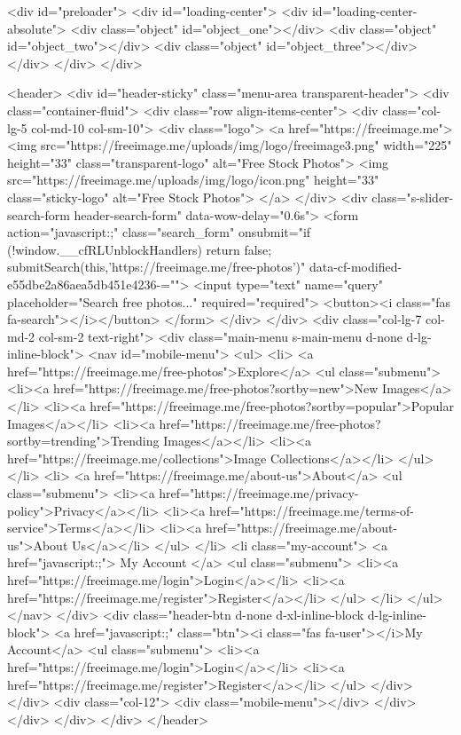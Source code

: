 <div id="preloader">
<div id="loading-center">
<div id="loading-center-absolute">
<div class="object" id="object_one"></div>
<div class="object" id="object_two"></div>
<div class="object" id="object_three"></div>
</div>
</div>
</div>


<header>
<div id="header-sticky" class="menu-area transparent-header">
<div class="container-fluid">
<div class="row align-items-center">
<div class="col-lg-5 col-md-10 col-sm-10">
<div class="logo">
<a href="https://freeimage.me">
<img src="https://freeimage.me/uploads/img/logo/freeimage3.png" width="225" height="33" class="transparent-logo" alt="Free Stock Photos">
<img src="https://freeimage.me/uploads/img/logo/icon.png" height="33" class="sticky-logo" alt="Free Stock Photos">
</a>
</div>
<div class="s-slider-search-form header-search-form" data-wow-delay="0.6s">
<form action="javascript:;" class="search_form" onsubmit="if (!window.__cfRLUnblockHandlers) return false; submitSearch(this,'https://freeimage.me/free-photos')" data-cf-modified-e55dbe2a86aea5db451e4236-="">
<input type="text" name="query" placeholder="Search free photos..." required="required">
<button><i class="fas fa-search"></i></button>
</form>
</div>
</div>
<div class="col-lg-7 col-md-2 col-sm-2 text-right">
<div class="main-menu s-main-menu d-none d-lg-inline-block">
<nav id="mobile-menu">
<ul>
<li>
<a href="https://freeimage.me/free-photos">Explore</a>
<ul class="submenu">
<li><a href="https://freeimage.me/free-photos?sortby=new">New Images</a></li>
<li><a href="https://freeimage.me/free-photos?sortby=popular">Popular Images</a></li>
<li><a href="https://freeimage.me/free-photos?sortby=trending">Trending Images</a></li>
<li><a href="https://freeimage.me/collections">Image Collections</a></li>
</ul>
</li>
<li>
<a href="https://freeimage.me/about-us">About</a>
<ul class="submenu">
<li><a href="https://freeimage.me/privacy-policy">Privacy</a></li>
<li><a href="https://freeimage.me/terms-of-service">Terms</a></li>
<li><a href="https://freeimage.me/about-us">About Us</a></li>
</ul>
</li>
<li class="my-account">
<a href="javascript:;">
My Account
</a>
<ul class="submenu">
<li><a href="https://freeimage.me/login">Login</a></li>
<li><a href="https://freeimage.me/register">Register</a></li>
</ul>
</li>
</ul>
</nav>
</div>
<div class="header-btn d-none d-xl-inline-block d-lg-inline-block">
<a href="javascript:;" class="btn"><i class="fas fa-user"></i>My Account</a>
<ul class="submenu">
<li><a href="https://freeimage.me/login">Login</a></li>
<li><a href="https://freeimage.me/register">Register</a></li>
</ul>
</div>
</div>
<div class="col-12">
<div class="mobile-menu"></div>
</div>
</div>
</div>
</div>
</header> 

